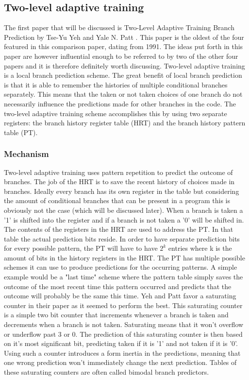 \subsection{Two-level adaptive training}
\label{two-level}
The first paper that will be discussed is Two-Level Adaptive Training Branch Prediction by Tse-Yu Yeh and Yale N.
Patt \cite{twolevel}.
This paper is the oldest of the four featured in this comparison paper, dating from 1991.
The ideas put forth in this paper are however influential enough to be referred to by two of the other four papers and it is therefore definitely worth discussing.
Two-level adaptive training is a local branch prediction scheme.
The great benefit of local branch prediction is that it is able to remember the histories of multiple conditional branches separately.
This means that the taken or not taken choices of one branch do not necessarily influence the predictions made for other branches in the code.
The two-level adaptive training scheme accomplishes this by using two separate registers: the branch history register table (HRT) and the branch history pattern table (PT).
\subsubsection{Mechanism}
Two-level adaptive training uses pattern repetition to predict the outcome of branches.
The job of the HRT is to save the recent history of choices made in branches.
Ideally every branch has its own register in the table but considering the amount of conditional branches that can be present in a program this is obviously not the case (which will be discussed later).
When a branch is taken a '1' is shifted into the register and if a branch is not taken a '0' will be shifted in.
The contents of the registers in the HRT are used to address the PT.
In that table the actual prediction bits reside.
In order to have separate prediction bits for every possible pattern, the PT will have to have $2^k$ entries where k is the amount of bits in the history registers in the HRT.
The PT has multiple possible schemes it can use to produce predictions for the occurring patterns.
A simple example would be a "last time" scheme where the pattern table simply saves the outcome of the most recent time this pattern occurred and predicts that the outcome will probably be the same this time.
Yeh and Patt favor a saturating counter in their paper as it seemed to perform the best.
This saturating counter is a simple two bit counter that increments whenever a branch is taken and decrements when a branch is not taken.
Saturating means that it won't overflow or underflow past 3 or 0.
The prediction of this saturating counter is then based on it's most significant bit, predicting taken if it is '1' and not taken if it is '0'.
Using such a counter introduces a form inertia in the predictions, meaning that one wrong prediction won't immediately change the next prediction.
Tables of these saturating counters are often called bimodal branch predictors.
